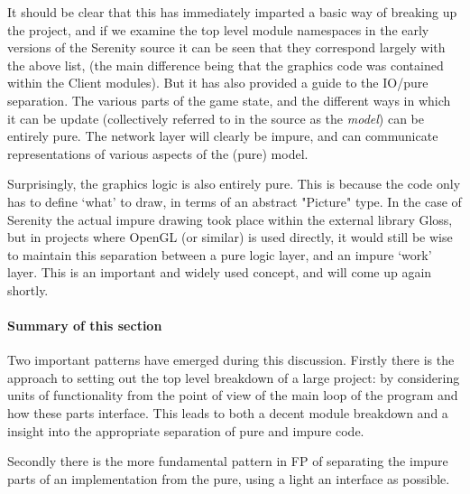\noindent It should be clear that this has immediately imparted a basic way of breaking up the project, and if we examine the top level module namespaces in the early versions of the Serenity source it can be seen that they correspond largely with the above list, (the main difference being that the graphics code was contained within the Client modules). But it has also provided a guide to the IO/pure separation. The various parts of the game state, and the different ways in which it can be update (collectively referred to in the source as the \emph{model}) can be entirely pure. The network layer will clearly be impure, and can communicate representations of various aspects of the (pure) model.

Surprisingly, the graphics logic is also entirely pure. This is because the code only has to define `what' to draw, in terms of an abstract "Picture" type. In the case of Serenity the actual impure drawing took place within the external library Gloss, but in projects where OpenGL (or similar) is used directly, it would still be wise to maintain this separation between a pure logic layer, and an impure `work' layer. This is an important and widely used concept, and will come up again shortly.

\paragraph{Summary of this section} Two important patterns have emerged during this discussion. Firstly there is the approach to setting out the top level breakdown of a large project: by considering units of functionality from the point of view of the main loop of the program and how these parts interface. This leads to both a decent module breakdown and a insight into the appropriate separation of pure and impure code. 

Secondly there is the more fundamental pattern in FP of separating the impure parts of an implementation from the pure, using a light an interface as possible.  
